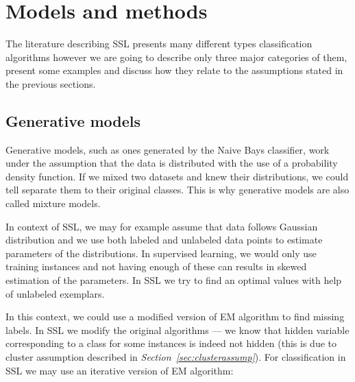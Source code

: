 \documentclass[12pt, a4paper, pdflatex]{report}
\begin{document}
\section{Models and methods}

The literature describing SSL presents many different types classification algorithms\cite{chapelle06,Zhu06semi} however we are going to describe only three major categories of them, present some examples and discuss how they relate to the assumptions stated in the previous sections.

\subsection{Generative models}

Generative models, such as ones generated by the Naive Bays classifier, work under the assumption that the data is distributed with the use of a probability density function. If we mixed two datasets and knew their distributions, we could tell separate them to their original classes. This is why generative models are also called mixture models\cite{Zhu06semi}.

In context of SSL, we may for example assume that data follows Gaussian distribution and we use both labeled and unlabeled data points to estimate parameters of the distributions. In supervised learning, we would only use training instances and not having enough of these can results in skewed estimation of the parameters. In SSL we try to find an optimal values with help of unlabeled exemplars.

In this context, we could use a modified version of EM algorithm to find missing labels. In SSL we modify the original algorithms --- we know that hidden variable corresponding to a class for some instances is indeed not hidden (this is due to cluster assumption described in \emph{Section~\ref{sec:clusterassump}})\cite{Zhu06semi, chapelle06}. For classification in SSL we may use an iterative version of EM algorithm:\\[1cm]
\end{document}
